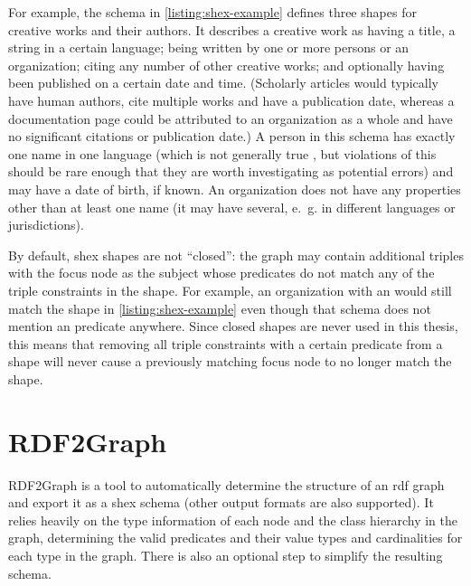 For example, the schema in \cref{listing:shex-example} defines three \glspl{shape}
for creative works and their authors.
It describes a creative work as having a title, a string in a certain language;
being written by one or more persons or an organization;
citing any number of other creative works;
and optionally having been published on a certain date and time.
(Scholarly articles would typically have human authors,
cite multiple works and have a publication date,
whereas a documentation page could be attributed to an organization as a whole
and have no significant citations or publication date.)
A person in this \gls{schema} has exactly one name in one language
(which is not generally true \cite{falsehoods-programmers-believe-about-names},
but violations of this should be rare enough
that they are worth investigating as potential errors)
and may have a date of birth, if known.
An organization does not have any properties other than at least one name
(it may have several, e.~g. in different languages or jurisdictions).


By default, \gls{shex} \glspl{shape} are not “closed”:
the graph may contain additional \glspl{triple} with the \gls{focus node} as the \gls{subject}
whose \glspl{predicate} do not match any of the \glspl{triple constraint} in the \gls{shape}.
For example, an organization with an  would still match the  shape in \cref{listing:shex-example}
even though that \gls{schema} does not mention an  \gls{predicate} anywhere.
Since closed shapes are never used in this thesis,
this means that removing all \glspl{triple constraint} with a certain \gls{predicate} from a \gls{shape}
will never cause a previously matching \gls{focus node} to no longer match the \gls{shape}.

\section{\gls{RDF2Graph}}
\label{sec:Background:RDF2Graph}

\Gls{RDF2Graph} \cite{vanDam2015}
is a tool to automatically determine the structure of an \gls{rdf} graph
and export it as a \gls{shex} \gls{schema}
(other output formats are also supported).
It relies heavily on the type information of each node and the class hierarchy in the graph,
determining the valid \glspl{predicate} and their value types and cardinalities for each type in the graph.
There is also an optional step to simplify the resulting \gls{schema}.

